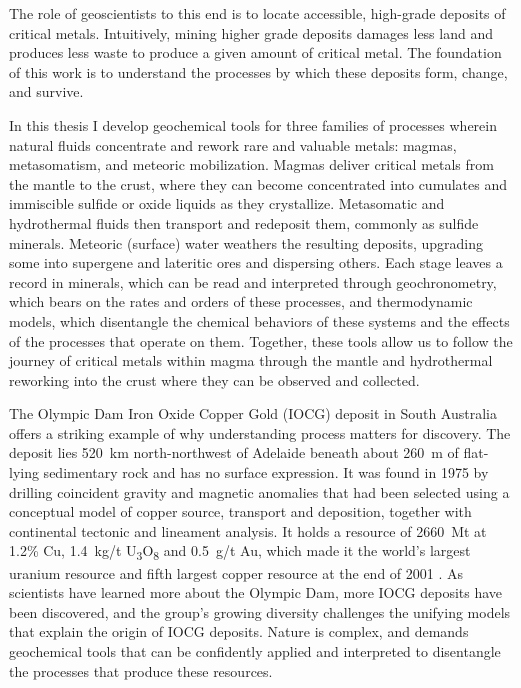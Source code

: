 The role of geoscientists to this end is to locate accessible, high-grade deposits of critical metals. Intuitively, mining higher grade deposits 
damages less land and produces less waste to produce a given amount of critical metal. The foundation of this work is to understand
the processes by which these deposits form, change, and survive.

In this thesis I develop geochemical tools for three families of processes wherein natural fluids 
concentrate and rework rare and valuable metals: magmas, metasomatism, and
meteoric mobilization. Magmas deliver critical metals from the mantle to the crust, where they can
become concentrated into cumulates and immiscible sulfide or oxide liquids as they crystallize. Metasomatic 
and hydrothermal fluids then transport and redeposit them, commonly as sulfide minerals. Meteoric (surface) water weathers the
resulting deposits, upgrading some into supergene and lateritic ores and dispersing
others. Each stage leaves a record in minerals, which can be read and interpreted through
geochronometry, which bears on the rates and orders of these processes, and thermodynamic models, which disentangle the chemical behaviors 
of these systems and the effects of the processes that operate on them. Together, these tools allow us to follow the journey of critical metals
within magma through the mantle and hydrothermal reworking into the crust where they can be observed and collected.

The Olympic Dam Iron Oxide Copper Gold (IOCG) deposit in South Australia offers a striking example of why understanding process matters
for discovery. The deposit lies 520~km north-northwest of Adelaide beneath about
260~m of flat-lying sedimentary rock and has no surface expression. It was found
in 1975 by drilling coincident gravity and magnetic anomalies that had been
selected using a conceptual model of copper source, transport and deposition,
together with continental tectonic and lineament analysis. It
holds a resource of 2660~Mt at 1.2\% Cu, 1.4~kg/t U\textsubscript{3}O\textsubscript{8}
and 0.5~g/t Au, which made it the world's largest uranium resource and fifth
largest copper resource at the end of 2001 \citep{esdale2003}. As scientists have 
learned more about the Olympic Dam, more IOCG deposits have been discovered, and the group's growing
diversity challenges the unifying models that explain the origin of IOCG deposits. Nature is complex, and
demands geochemical tools that can be confidently applied and interpreted to disentangle the
processes that produce these resources.

